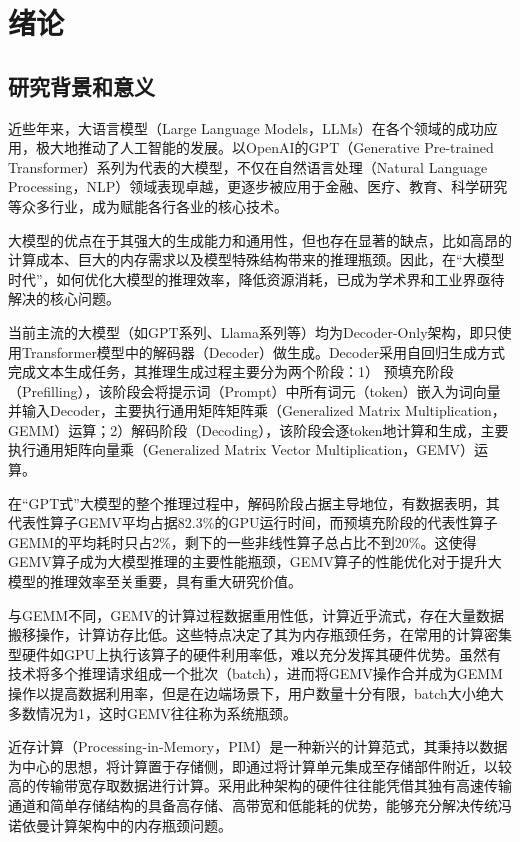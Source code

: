 \chapter{绪论}
\section{研究背景和意义}
近些年来，大语言模型（Large Language Models，LLMs）在各个领域的成功应用，极大地推动了人工智能的发展。以OpenAI的GPT（Generative Pre-trained Transformer）系列为代表的大模型，不仅在自然语言处理（Natural Language Processing，NLP）领域表现卓越，更逐步被应用于金融、医疗、教育、科学研究等众多行业，成为赋能各行各业的核心技术。

大模型的优点在于其强大的生成能力和通用性，但也存在显著的缺点，比如高昂的计算成本、巨大的内存需求以及模型特殊结构带来的推理瓶颈。因此，在“大模型时代”，如何优化大模型的推理效率，降低资源消耗，已成为学术界和工业界亟待解决的核心问题。

当前主流的大模型（如GPT系列、Llama系列等）均为Decoder-Only架构，即只使用Transformer模型\cite{Transformer}中的解码器（Decoder）做生成\cite{GPT-1,Llama2}。Decoder采用自回归生成方式完成文本生成任务，其推理生成过程主要分为两个阶段：1） 预填充阶段（Prefilling），该阶段会将提示词（Prompt）中所有词元（token）嵌入为词向量并输入Decoder，主要执行通用矩阵矩阵乘（Generalized Matrix Multiplication，GEMM）运算；2）解码阶段（Decoding），该阶段会逐token地计算和生成，主要执行通用矩阵向量乘（Generalized Matrix Vector Multiplication，GEMV）运算。

在“GPT式”大模型的整个推理过程中，解码阶段占据主导地位\cite{InferLinear}，有数据表明，其代表性算子GEMV平均占据82.3\%的GPU运行时间，而预填充阶段的代表性算子GEMM的平均耗时只占2\%，剩下的一些非线性算子总占比不到20\%\cite{SamsungHotChips}。这使得GEMV算子成为大模型推理的主要性能瓶颈，GEMV算子的性能优化对于提升大模型的推理效率至关重要，具有重大研究价值。

与GEMM不同，GEMV的计算过程数据重用性低，计算近乎流式，存在大量数据搬移操作，计算访存比低。这些特点决定了其为内存瓶颈任务，在常用的计算密集型硬件如GPU上执行该算子的硬件利用率低，难以充分发挥其硬件优势。虽然有技术将多个推理请求组成一个批次（batch），进而将GEMV操作合并成为GEMM操作以提高数据利用率\cite{Orca}，但是在边端场景下，用户数量十分有限，batch大小绝大多数情况为1，这时GEMV往往称为系统瓶颈\cite{PIMnast}。

近存计算（Processing-in-Memory，PIM）是一种新兴的计算范式，其秉持以数据为中心的思想，将计算置于存储侧，即通过将计算单元集成至存储部件附近，以较高的传输带宽存取数据进行计算。采用此种架构的硬件往往能凭借其独有高速传输通道和简单存储结构的具备高存储、高带宽和低能耗的优势，能够充分解决传统冯诺依曼计算架构中的内存瓶颈问题。


